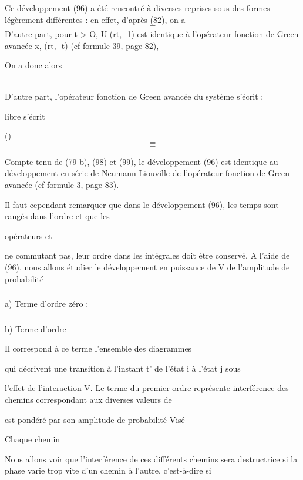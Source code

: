 Ce développement (96) a été rencontré à diverses reprises sous des
formes légèrement différentes : en effet, d'après (82), on a
\[
\tag{97}=
\]
D'autre part, pour t > O, U (rt, -1) est identique à l'opérateur
fonction de Green avancée x, (rt, -t) (cf formule 39, page 82),

On a donc alors

\[
\tag{98}=
\]

D'autre part, l'opérateur fonction de Green avancée du système
 s'écrit :

libre  s'écrit

()
\[
\tag{99}=
\]
\[
\tag{100}=
\]


Compte tenu de (79-b), (98) et (99), le développement (96) est identique au
développement en série de Neumann-Liouville de l'opérateur fonction de Green
avancée (cf formule 3, page 83).

Il faut cependant remarquer que dans le développement (96),
les temps sont rangés  dans l'ordre  et que les

opérateurs  et 

ne commutant pas, leur ordre dans les intégrales doit être conservé.
A l'aide de (96), nous allons étudier le développement en
puissance de V de l'amplitude de probabilité

\subsubsection{}%
a) Terme d'ordre zéro :

\subsubsection{}%
b) Terme d'ordre 

Il correspond à ce terme l'ensemble des diagrammes

qui décrivent une transition à l'instant t' de l'état i à l'état j sous

l'effet de l'interaction V. Le terme du premier ordre représente  interférence
des chemins correspondant aux diverses valeurs de 

est pondéré par son amplitude de probabilité  Visé

Chaque chemin

%
 
Nous allons voir que l'interférence de ces différents
chemins sera destructrice si la phase varie trop vite d'un chemin
à l'autre, c'est-à-dire si

